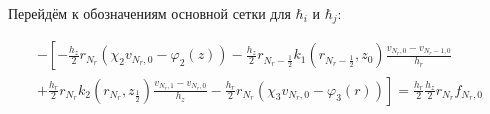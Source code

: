 Перейдём к обозначениям основной сетки для $ \hbar_i $ и $ \hbar_j $:

\begin{align*}
  - \left [ 
  -\frac{h_z}{2} r_{N_r} (\chi_2 v_{N_r, 0} - \varphi_2(z) )
  - \frac{h_z}{2} r_{N_r-\frac{1}{2}} k_1(r_{N_r-\frac{1}{2}}, z_0) \frac{v_{N_r, 0} - v_{N_r - 1, 0}}{h_{r}}
  \right . \\
  \left .
  + \frac{h_r}{2} r_{N_r} k_2(r_{N_r}, z_{\frac{1}{2}}) \frac{v_{N_r, 1} - v_{N_r, 0}}{h_{z}}
  - \frac{h_r}{2} r_{N_r} (\chi_3 v_{N_r, 0} - \varphi_3(r))
  \right ]  = \frac{h_r}{2} \frac{h_z}{2} r_{N_r} f_{N_r, 0}
\end{align*}